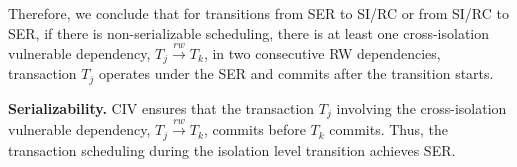
Therefore, we conclude that for transitions from SER to SI/RC or from SI/RC to SER, if there is non-serializable scheduling, there is at least one cross-isolation vulnerable dependency, $T_j \xrightarrow{rw} T_k$, in two consecutive RW dependencies, transaction $T_j$ operates under the SER and commits after the transition starts. 

\noindent \textbf{Serializability.} CIV ensures that the transaction $T_j$ involving the cross-isolation vulnerable dependency, $T_j \xrightarrow{rw} T_k$, commits before $T_k$ commits. Thus, the transaction scheduling during the isolation level transition achieves SER.



